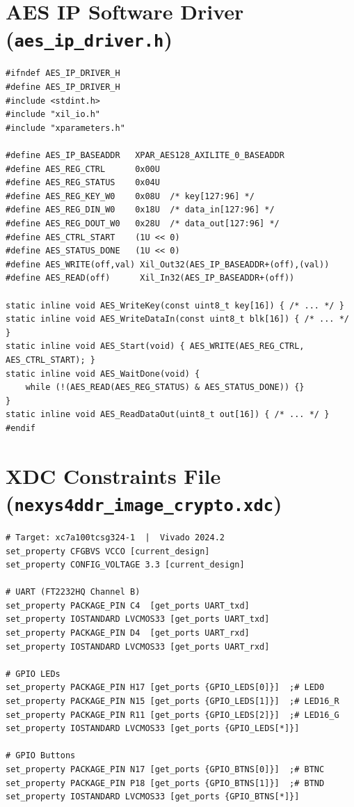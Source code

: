 \documentclass[12pt,a4paper]{article}
\begin{document}
\renewcommand{\thesection}{D}
\section{AES IP Software Driver (\texttt{aes\_ip\_driver.h})}
\label{app:driver}

\begin{lstlisting}[style=cstyle, caption={aes\_ip\_driver.h -- AXI-Lite C Driver API}]
#ifndef AES_IP_DRIVER_H
#define AES_IP_DRIVER_H
#include <stdint.h>
#include "xil_io.h"
#include "xparameters.h"

#define AES_IP_BASEADDR   XPAR_AES128_AXILITE_0_BASEADDR
#define AES_REG_CTRL      0x00U
#define AES_REG_STATUS    0x04U
#define AES_REG_KEY_W0    0x08U  /* key[127:96] */
#define AES_REG_DIN_W0    0x18U  /* data_in[127:96] */
#define AES_REG_DOUT_W0   0x28U  /* data_out[127:96] */
#define AES_CTRL_START    (1U << 0)
#define AES_STATUS_DONE   (1U << 0)
#define AES_WRITE(off,val) Xil_Out32(AES_IP_BASEADDR+(off),(val))
#define AES_READ(off)      Xil_In32(AES_IP_BASEADDR+(off))

static inline void AES_WriteKey(const uint8_t key[16]) { /* ... */ }
static inline void AES_WriteDataIn(const uint8_t blk[16]) { /* ... */ }
static inline void AES_Start(void) { AES_WRITE(AES_REG_CTRL, AES_CTRL_START); }
static inline void AES_WaitDone(void) {
    while (!(AES_READ(AES_REG_STATUS) & AES_STATUS_DONE)) {}
}
static inline void AES_ReadDataOut(uint8_t out[16]) { /* ... */ }
#endif
\end{lstlisting}

\renewcommand{\thesection}{E}
\section{XDC Constraints File (\texttt{nexys4ddr\_image\_crypto.xdc})}
\label{app:xdc}

\begin{lstlisting}[style=tclstyle, caption={nexys4ddr\_image\_crypto.xdc -- Physical Pin Constraints}]
# Target: xc7a100tcsg324-1  |  Vivado 2024.2
set_property CFGBVS VCCO [current_design]
set_property CONFIG_VOLTAGE 3.3 [current_design]

# UART (FT2232HQ Channel B)
set_property PACKAGE_PIN C4  [get_ports UART_txd]
set_property IOSTANDARD LVCMOS33 [get_ports UART_txd]
set_property PACKAGE_PIN D4  [get_ports UART_rxd]
set_property IOSTANDARD LVCMOS33 [get_ports UART_rxd]

# GPIO LEDs
set_property PACKAGE_PIN H17 [get_ports {GPIO_LEDS[0]}]  ;# LED0
set_property PACKAGE_PIN N15 [get_ports {GPIO_LEDS[1]}]  ;# LED16_R
set_property PACKAGE_PIN R11 [get_ports {GPIO_LEDS[2]}]  ;# LED16_G
set_property IOSTANDARD LVCMOS33 [get_ports {GPIO_LEDS[*]}]

# GPIO Buttons
set_property PACKAGE_PIN N17 [get_ports {GPIO_BTNS[0]}]  ;# BTNC
set_property PACKAGE_PIN P18 [get_ports {GPIO_BTNS[1]}]  ;# BTND
set_property IOSTANDARD LVCMOS33 [get_ports {GPIO_BTNS[*]}]
\end{lstlisting}
\end{document}
